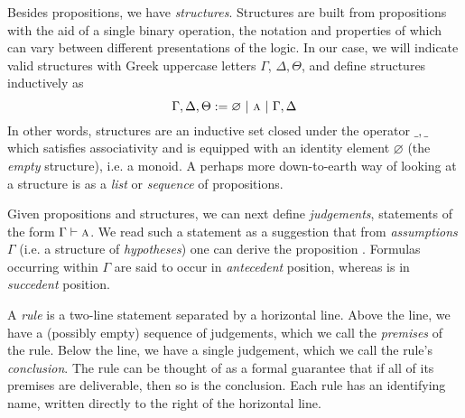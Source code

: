 Besides propositions, we have \textit{structures}. 
Structures are built from propositions with the aid of a single binary operation, the notation and properties of which can vary between different presentations of the logic.
In our case, we will indicate valid structures with Greek uppercase letters $\Gamma$, $\Delta, \Theta$, and define structures inductively as 
\begin{equation}
	\Gamma, \Delta, \Theta := \varnothing \ | \ \prop{a} \ | \ \Gamma, \Delta
\end{equation}
In other words, structures are an inductive set closed under the operator $\_,\_$ which satisfies associativity and is equipped with an identity element $\varnothing$ (the \textit{empty} structure), i.e. a monoid.
A perhaps more down-to-earth way of looking at a structure is as a \textit{list} or \textit{sequence} of propositions.

Given propositions and structures, we can next define \textit{judgements}, statements of the form
$\Gamma \vdash \prop{a}$.
We read such a statement as a suggestion that from \textit{assumptions} $\Gamma$ (i.e. a structure of \textit{hypotheses}) one can derive the proposition .
Formulas occurring within $\Gamma$ are said to occur in \textit{antecedent} position, whereas  is in \textit{succedent} position.

A \textit{rule} is a two-line statement separated by a horizontal line.
Above the line, we have a (possibly empty) sequence of judgements, which we call the \textit{premises} of the rule.
Below the line, we have a single judgement, which we call the rule's \textit{conclusion}.
The rule can be thought of as a formal guarantee that if all of its premises are deliverable, then so is the conclusion.
Each rule has an identifying name, written directly to the right of the horizontal line.

